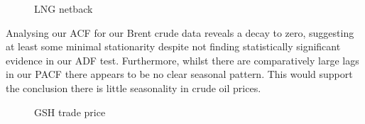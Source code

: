 \begin{figure}[H]
    \centering
    \qquad
    \caption{LNG netback}%
    \label{fig:example3}%
\end{figure}

Analysing our ACF for our Brent crude data reveals a decay to zero, suggesting at least some minimal stationarity despite not finding statistically significant evidence in our ADF test. Furthermore, whilst there are comparatively large lags in our PACF there appears to be no clear seasonal pattern. This would support the conclusion there is little seasonality in crude oil prices.

\begin{figure}[H]
    \centering
    \qquad
    \caption{GSH trade price}%
    \label{fig:example4}%
\end{figure}

